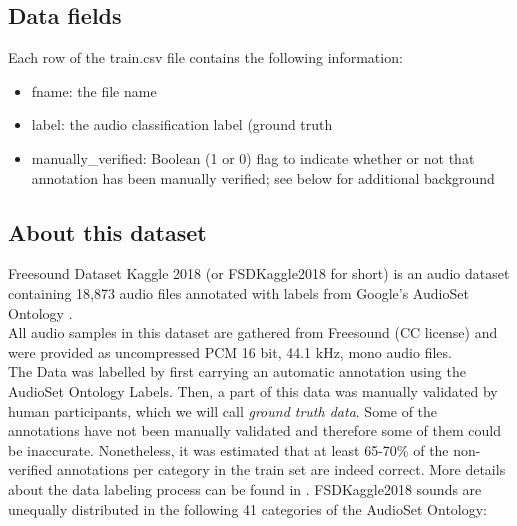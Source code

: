 \documentclass{article} %
\begin{document}
	\subsection{Data fields}
		Each row of the train.csv file contains the following information:
			\begin{itemize}
			    \item fname: the file name
			    \item label: the audio classification label (ground truth
			    \item manually\_verified: Boolean (1 or 0) flag to indicate whether or not that annotation has been manually verified; see below for additional background
			\end{itemize}

	\subsection{About this dataset}
		Freesound Dataset Kaggle 2018 (or FSDKaggle2018 for short) is an audio dataset containing 18,873 audio files annotated with labels from Google's AudioSet Ontology \cite{cite9}.\\
		\newline
		All audio samples in this dataset are gathered from Freesound \cite{cite10} (CC license) and were provided as uncompressed PCM 16 bit, 44.1 kHz, mono audio files.\\
		\newline
		The Data was labelled by first carrying an automatic annotation using the AudioSet Ontology Labels. Then, a part of this data was manually validated by human participants, which we will call \emph{ground truth data}. Some of the annotations have not been manually validated and therefore some of them could be inaccurate. Nonetheless, it was estimated that at least 65-70\% of the non-verified annotations per category in the train set are indeed correct. More details about the data labeling process can be found in \cite{cite11}.
		\newline
		FSDKaggle2018 sounds are unequally distributed in the following 41 categories of the AudioSet Ontology:\\
\end{document}
